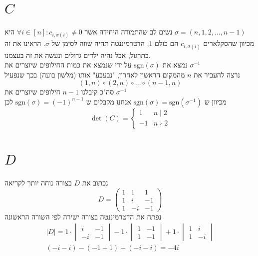 \documentclass[12pt, titlepage]{article}
\begin{document}
\section*{$C$}
נשים לב שהתמורה היחידה אשר $\forall i \in \left[n\right]: c_{i,\sigma\left(i\right)}\neq 0$ היא $\sigma= \left(n,1,2,\ldots,n-1\right)$\\
מכיוון שהסקלארים $c_{i,\sigma\left(i\right)}$ הם כולם $1$, הדטרמיננטה תהיה שווה לסימן של $\sigma$. הראינו את זה בתרגול, אבל נהיה ילדים גדולים ונעשה את זה בעצמנו.\\
נמצא את $\mathrm{sgn}\left(\sigma\right)$ על ידי שנמצא את כמות החילופים שיוצרים את $\sigma^{-1}$\\
נרצה להעביר את $n$ מהמקום הראשון לאחרון, "נבעבע" אותו (מלשון בועה) בכך שנפעיל
\[
    \left(1,n\right)\circ \left(2,n\right) \circ \dots \circ \left(n-1,n\right)
\]
סה"כ קיבלנו $n-1$ חילופים שיוצרים את $\sigma^{-1}$ \\
מכיוון ש $\mathrm{sgn}\left(\sigma\right) = \mathrm{sgn}\left(\sigma^{-1}\right)$ אנחנו מקבלים ש $\mathrm{sgn}\left(\sigma\right)=\left(-1\right)^{n-1}$
לכן
\[
    \det\left(C\right) = \begin{cases}
        1 & n\mid2\\
        -1 & n\nmid2
    \end{cases}
\]
\section*{$D$}
נכתוב את $D$ בצורה נוחה יותר לקריאה
\[
    D= \begin{pmatrix}
        1 & 1 & 1 \\
        1 & i & -1 \\
        1 & -i & -1
    \end{pmatrix}
\]
נפתח את הדטרמיננטה בצורה ישירה לפי השורה הראשונה
\begin{gather*}
    \left|D\right| = 1 \cdot \begin{vmatrix}
    i & -1 \\ -i & -1\end{vmatrix} - 1 \cdot \begin{vmatrix}
    1 & -1 \\ 1 & -1
    \end{vmatrix} + 1 \cdot \begin{vmatrix}
    1 & i \\ 1 & -i
    \end{vmatrix} \\
    \left(-i-i\right) - \left(-1+1\right) + \left(-i -i \right) = \boxed{-4i}
\end{gather*}
\newpage
\end{document}
